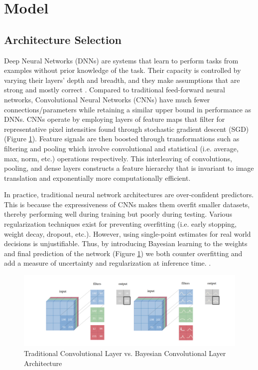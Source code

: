 \section{Model}

\subsection{Architecture Selection}

Deep Neural Networks (DNNs) are systems that learn to perform tasks from examples without prior knowledge of the task. Their capacity is controlled by varying their layers' depth and breadth, and they make assumptions that are strong and mostly correct \cite{krizhevsky2012alexnet}. Compared to traditional feed-forward neural networks, Convolutional Neural Networks (CNNs) have much fewer connections/parameters while retaining a similar upper bound in performance as DNNs. CNNs operate by employing layers of feature maps that filter for representative pixel intensities found through stochastic gradient descent (SGD) (Figure \ref{fig:BayesCNNwithdist}). Feature signals are then boosted through transformations \cite{Oquab2014} such as filtering and pooling which involve convolutional and statistical (i.e. average, max, norm, etc.) operations respectively. This interleaving of convolutions, pooling, and dense layers constructs a feature hierarchy that is invariant to image translation and exponentially more computationally efficient. 

In practice, traditional neural network architectures are over-confident predictors. This is because the expressiveness of CNNs makes them overfit smaller datasets, thereby performing well during training but poorly during testing. Various regularization techniques \cite{dialameh2020dlreg} exist for preventing overfitting (i.e. early stopping, weight decay, dropout, etc.). However, using single-point estimates for real world decisions is unjustifiable. Thus, by introducing Bayesian learning to the weights and final prediction of the network (Figure \ref{fig:BayesCNNwithdist}) we both counter overfitting and add a measure of uncertainty and regularization at inference time. \cite{shridhar2019comprehensive}.

\begin{figure}[!htb]
  \centering
  \includegraphics[width=\columnwidth]{Figures/BayesCNNwithdist.png}
  \caption{Traditional Convolutional Layer vs. Bayesian Convolutional Layer Architecture}
  \label{fig:BayesCNNwithdist}
  \vspace{-1em}
\end{figure}

